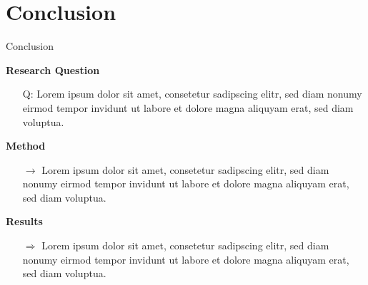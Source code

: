\documentclass[compress, aspectratio=169, xcolor=dvipsnames]{beamer}
\begin{document}
\section{Conclusion}
\begin{frame}{Conclusion}

\textbf{Research Question} \\
\begin{itemize}
	\item[Q:] Lorem ipsum dolor sit amet, consetetur sadipscing elitr, sed diam nonumy eirmod tempor invidunt ut labore et dolore magna aliquyam erat, sed diam voluptua.
\end{itemize}

\textbf{Method} \\
\begin{itemize}
	\item[$\rightarrow$] Lorem ipsum dolor sit amet, consetetur sadipscing elitr, sed diam nonumy eirmod tempor invidunt ut labore et dolore magna aliquyam erat, sed diam voluptua.
\end{itemize}

\textbf{Results} \\

\begin{itemize}
	\item[$\Rightarrow$] Lorem ipsum dolor sit amet, consetetur sadipscing elitr, sed diam nonumy eirmod tempor invidunt ut labore et dolore magna aliquyam erat, sed diam voluptua.
\end{itemize}


\end{frame}
\end{document}
